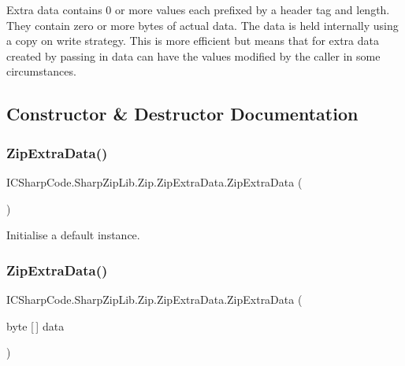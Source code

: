 Extra data contains 0 or more values each prefixed by a header tag and length. They contain zero or more bytes of actual data. The data is held internally using a copy on write strategy. This is more efficient but means that for extra data created by passing in data can have the values modified by the caller in some circumstances. 

\subsection{Constructor \& Destructor Documentation}
\mbox{\label{class_i_c_sharp_code_1_1_sharp_zip_lib_1_1_zip_1_1_zip_extra_data_a16c63f6fd53ff88f18cd509fce6ba9e0}} 
\subsubsection{\texorpdfstring{Zip\+Extra\+Data()}{ZipExtraData()}\hspace{0.1cm}{\footnotesize\ttfamily [1/4]}}
{\footnotesize\ttfamily I\+C\+Sharp\+Code.\+Sharp\+Zip\+Lib.\+Zip.\+Zip\+Extra\+Data.\+Zip\+Extra\+Data (\begin{DoxyParamCaption}{ }\end{DoxyParamCaption})\hspace{0.3cm}{\ttfamily [inline]}}



Initialise a default instance. 

\mbox{\label{class_i_c_sharp_code_1_1_sharp_zip_lib_1_1_zip_1_1_zip_extra_data_a502553a7e72471833236dad3f46ab409}} 
\subsubsection{\texorpdfstring{Zip\+Extra\+Data()}{ZipExtraData()}\hspace{0.1cm}{\footnotesize\ttfamily [2/4]}}
{\footnotesize\ttfamily I\+C\+Sharp\+Code.\+Sharp\+Zip\+Lib.\+Zip.\+Zip\+Extra\+Data.\+Zip\+Extra\+Data (\begin{DoxyParamCaption}\item[{byte \mbox{[}$\,$\mbox{]}}]{data }\end{DoxyParamCaption})\hspace{0.3cm}{\ttfamily [inline]}}




